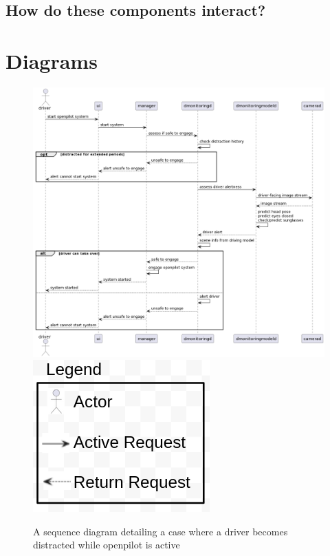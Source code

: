 \documentclass[12pt]{article}
\begin{document}
\subsection{How do these components interact?}

\section{Diagrams}

\begin{figure}[ht]
    \includegraphics[scale=0.4]{Assets/sequence.png}
    \\
    \includegraphics[scale=0.4]{Assets/legend.png}
    \caption{A sequence diagram detailing a case where a driver becomes distracted while openpilot is active}
    \label{fig:enter-label}
\end{figure}
\end{document}
